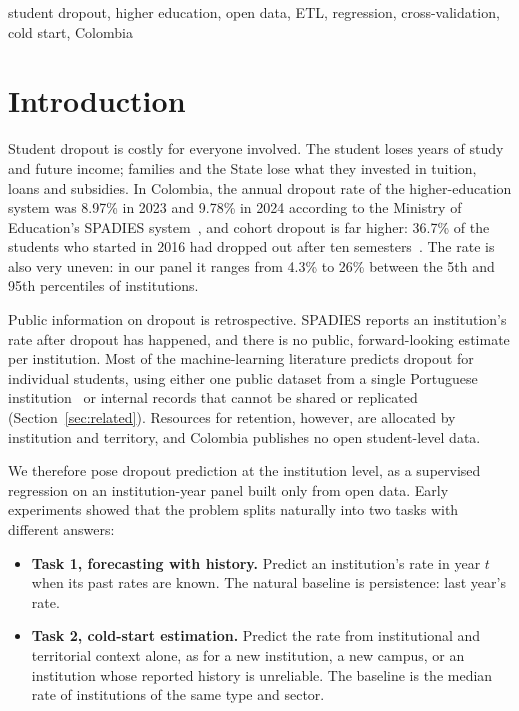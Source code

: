 \documentclass[conference]{IEEEtran}
\begin{document}
\begin{IEEEkeywords}
student dropout, higher education, open data, ETL, regression, cross-validation, cold start, Colombia
\end{IEEEkeywords}

\section{Introduction}

Student dropout is costly for everyone involved. The student loses years of study and future income; families and the State lose what they invested in tuition, loans and subsidies. In Colombia, the annual dropout rate of the higher-education system was 8.97\% in 2023 and 9.78\% in 2024 according to the Ministry of Education's SPADIES system~\cite{men_spadies}, and cohort dropout is far higher: 36.7\% of the students who started in 2016 had dropped out after ten semesters~\cite{lee74}. The rate is also very uneven: in our panel it ranges from 4.3\% to 26\% between the 5th and 95th percentiles of institutions.

Public information on dropout is retrospective. SPADIES reports an institution's rate after dropout has happened, and there is no public, forward-looking estimate per institution. Most of the machine-learning literature predicts dropout for individual students, using either one public dataset from a single Portuguese institution~\cite{realinho2022} or internal records that cannot be shared or replicated (Section~\ref{sec:related}). Resources for retention, however, are allocated by institution and territory, and Colombia publishes no open student-level data.

We therefore pose dropout prediction at the institution level, as a supervised regression on an institution-year panel built only from open data. Early experiments showed that the problem splits naturally into two tasks with different answers:
\begin{itemize}
\item \textbf{Task 1, forecasting with history.} Predict an institution's rate in year $t$ when its past rates are known. The natural baseline is persistence: last year's rate.
\item \textbf{Task 2, cold-start estimation.} Predict the rate from institutional and territorial context alone, as for a new institution, a new campus, or an institution whose reported history is unreliable. The baseline is the median rate of institutions of the same type and sector.
\end{itemize}
\end{document}
